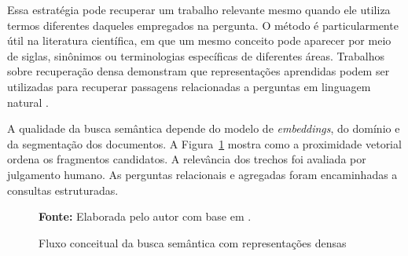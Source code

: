 Essa estratégia pode recuperar um trabalho relevante mesmo quando ele utiliza termos diferentes daqueles empregados na pergunta. O método é particularmente útil na literatura científica, em que um mesmo conceito pode aparecer por meio de siglas, sinônimos ou terminologias específicas de diferentes áreas. Trabalhos sobre recuperação densa demonstram que representações aprendidas podem ser utilizadas para recuperar passagens relacionadas a perguntas em linguagem natural \cite{karpukhin2020dpr}.

A qualidade da busca semântica depende do modelo de \textit{embeddings}, do domínio e da segmentação dos documentos. A Figura~\ref{fig:busca-semantica} mostra como a proximidade vetorial ordena os fragmentos candidatos. A relevância dos trechos foi avaliada por julgamento humano. As perguntas relacionais e agregadas foram encaminhadas a consultas estruturadas.

\begin{figure}[!htbp]
\centering
\begin{minipage}{0.96\textwidth}
\caption{Fluxo conceitual da busca semântica com representações densas}
\label{fig:busca-semantica}
\par\smallskip
{\footnotesize\raggedright\textbf{Fonte:} Elaborada pelo autor com base em \cite{reimers2019sbert,karpukhin2020dpr}.\par}
\end{minipage}
\end{figure}

